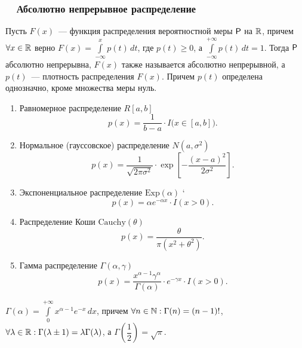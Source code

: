 \subsubsection*{~~Абсолютно непрерывное распределение}
\begin{definition}
	Пусть $F(x)$~--- функция распределения вероятностной меры $\P$ на $\R$, причем $\forall x \in \R$ верно $F(x) = \int\limits_{-\infty}^{x} p(t) \, d t$, где  $p(t) \geqslant 0$, а $\int\limits_{-\infty}^{+\infty} p(t) \, d t = 1$. Тогда $\P$ абсолютно непрерывна, $F(x)$ также называется абсолютно непрерывной, а $p(t)$~--- плотность распределения $F(x)$. Причем $p(t)$ определена однозначно, кроме множества меры нуль.
\end{definition}
\begin{enumerate}
	\item{ Равномерное распределение $R[a,b]$ 
		$$p(x) = \frac{1}{b -a } \cdot I \big( x \in [a,b] \big). $$}
	\item{Нормальное (гауссовское) распределение $N(a, \sigma^2)$
		$$p(x) = \frac{1}{\sqrt{2 \pi \sigma^2}} \cdot \exp \left[ -\frac{(x - a)^2}{2 \sigma^2} \right]. $$}
	\item{Экспоненциальное распределение $\text{Exp}(\alpha)$
	`	$$p(x) = \alpha e^{-\alpha x} \cdot I(x > 0).$$}
	\item{Распределение Коши $\text{Cauchy}(\theta)$
		$$p(x) = \frac{\theta}{\pi \left(x^2 + \theta^2 \right)}.$$}
	\item{ Гамма распределение $\Gamma(\alpha, \gamma)$
		$$p(x) = \frac{x^{\alpha - 1} \gamma^{\alpha}}{\Gamma(\alpha)} \cdot e^{-\gamma x} \cdot I(x > 0).$$}
\end{enumerate}
\begin{definition}
	$\Gamma(\alpha) = \int\limits_0^{+\infty} x^{\alpha - 1} e^{-x} \, d x$, причем $\forall n \in \N : \Gamma(n) = (n - 1)!$, $\forall \lambda \in \R: \Gamma(\lambda \pm 1) = \lambda \Gamma(\lambda)$, а $\Gamma(\dfrac{1}{2}) = \sqrt{\pi}$.
\end{definition}
